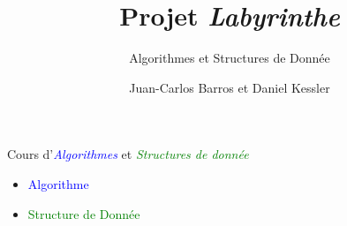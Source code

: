 \documentclass{beamer}
\title{Projet \textit{Labyrinthe}}
\subtitle{Algorithmes et Structures de Donnée}
\author{Juan-Carlos Barros et Daniel Kessler}
\begin{document}
\begin{frame}
  \titlepage
\end{frame}

\begin{frame}
  Cours d'\textit{\textcolor<1>{blue}{Algorithmes}}
  et \textit{\textcolor<1>{green}{Structures de donnée}}
  \par\bigskip
  \par
  \begin{minipage}{.5\linewidth}
  \begin{itemize}
  \item<2->\textcolor{blue}{Algorithme}\par{}
  \item<2->\textcolor{green}{Structure de Donnée}\par{}
  \end{itemize}
  \end{minipage}
  \begin{minipage}{.3\linewidth}
  \end{minipage}
\end{frame} %
\end{document}

